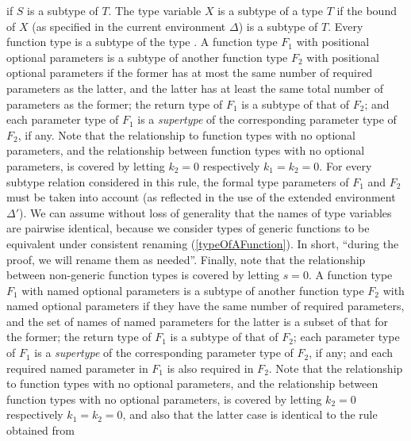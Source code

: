 \documentclass[makeidx]{article}
\begin{document}
{{\begin{itemize}
    if $S$ is a subtype of $T$.
    The type variable $X$ is a subtype of a type $T$
    if the bound of $X$
    (as specified in the current environment $\Delta$)
    is a subtype of $T$.
    Every function type is a subtype of the type \FUNCTION.
    A function type $F_1$ with positional optional parameters
    is a subtype of
    another function type $F_2$ with positional optional parameters
    if the former has at most
    the same number of required parameters as the latter,
    and the latter has at least
    the same total number of parameters as the former;
    the return type of $F_1$ is a subtype of that of $F_2$;
    and each parameter type of $F_1$ is a \emph{supertype} of
    the corresponding parameter type of $F_2$, if any.
    Note that the relationship to function types with no optional parameters,
    and the relationship between function types with no optional parameters,
    is covered by letting $k_2 = 0$ respectively $k_1 = k_2 = 0$.
    For every subtype relation considered in this rule,
    the formal type parameters of $F_1$ and $F_2$ must be taken into account
    (as reflected in the use of the extended environment $\Delta'$).
    We can assume without loss of generality
    that the names of type variables are pairwise identical,
    because we consider types of generic functions to be equivalent under
    consistent renaming
    (\ref{typeOfAFunction}).
    In short, ``during the proof, we will rename them as needed''.
    Finally, note that the relationship between non-generic function types
    is covered by letting $s = 0$.
    A function type $F_1$ with named optional parameters is a subtype of
    another function type $F_2$ with named optional parameters
    if they have the same number of required parameters,
    and the set of names of named parameters for the latter is a subset
    of that for the former;
    the return type of $F_1$ is a subtype of that of $F_2$;
    each parameter type of $F_1$ is a \emph{supertype} of
    the corresponding parameter type of $F_2$, if any;
    and each required named parameter in $F_1$ is also required in $F_2$.
    Note that the relationship to function types with no optional parameters,
    and the relationship between function types with no optional parameters,
    is covered by letting $k_2 = 0$ respectively $k_1 = k_2 = 0$,
    and also that the latter case is identical to the rule obtained from

\end{itemize}}}
\end{document}
